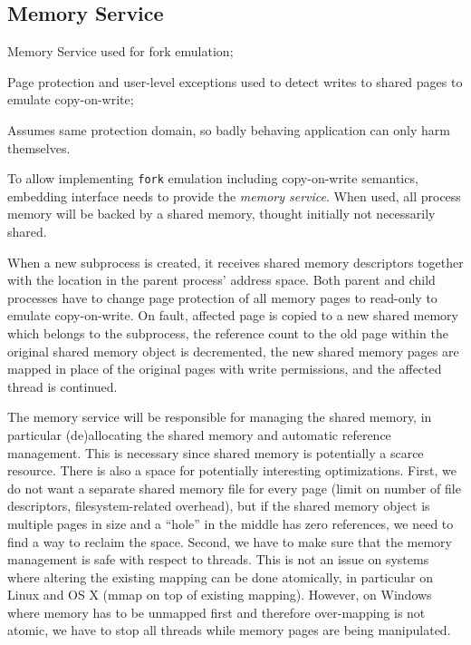 \subsection{Memory Service}
\label{sub:memory_service}

\begin{structure}
\item Memory Service used for fork emulation;
\item Page protection and user-level exceptions used to detect
  writes to shared pages to emulate copy-on-write;
\item Assumes same protection domain, so badly behaving application
  can only harm themselves.
\end{structure}

To allow implementing \lstinline`fork` emulation including copy-on-write
semantics, embedding interface needs to provide the \emph{memory
service}. When used, all process memory will be backed by a shared
memory, thought initially not necessarily shared.

When a new subprocess is created, it receives shared memory descriptors
together with the location in the parent process' address space. Both
parent and child processes have to change page protection of all memory
pages to read-only to emulate copy-on-write. On fault, affected page is
copied to a new shared memory which belongs to the subprocess, the
reference count to the old page within the original shared memory object
is decremented, the new shared memory pages are mapped in place of the
original pages with write permissions, and the affected thread is
continued.

The memory service will be responsible for managing the shared memory,
in particular (de)allocating the shared memory and automatic reference
management. This is necessary since shared memory is potentially a
scarce resource. There is also a space for potentially interesting
optimizations. First, we do not want a separate shared memory file for
every page (\eg limit on number of file descriptors, filesystem-related
overhead), but if the shared memory object is multiple pages in size and
a ``hole'' in the middle has zero references, we need to find a way to
reclaim the space. Second, we have to make sure that the memory
management is safe with respect to threads. This is not an issue on
systems where altering the existing mapping can be done atomically, in
particular on Linux and OS X (\ie mmap on top of existing mapping).
However, on Windows where memory has to be unmapped first and therefore
over-mapping is not atomic, we have to stop all threads while memory
pages are being manipulated.

